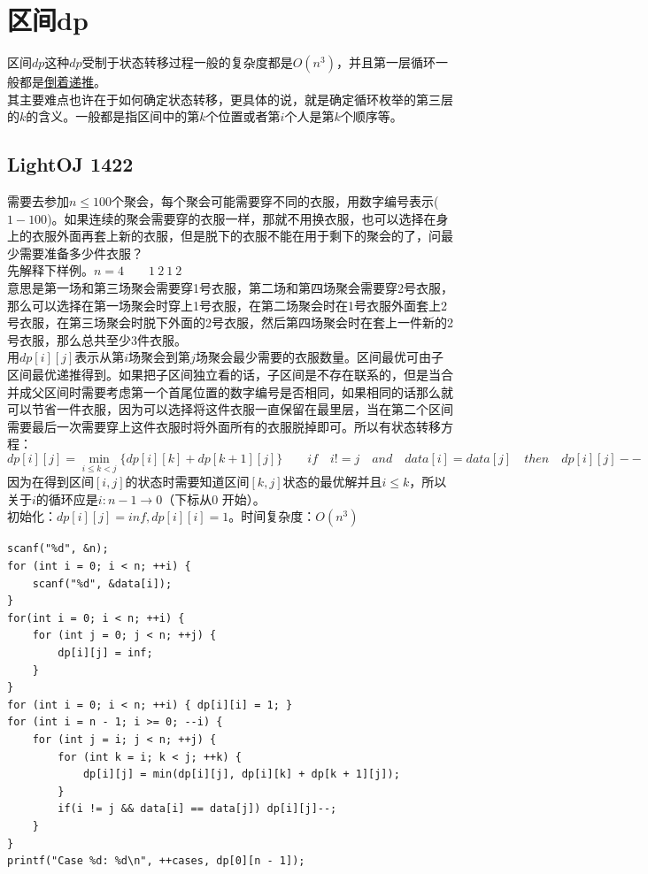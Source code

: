 \clearpage
\section{区间dp}

区间$dp$这种$dp$受制于状态转移过程一般的复杂度都是$O(n^3)$，并且第一层循环一般都是\underline{倒着递推}。 \\
其主要难点也许在于如何确定状态转移，更具体的说，就是确定循环枚举的第三层的$k$的含义。一般都是指区间中的第$k$个位置或者第$i$个人是第$k$个顺序等。

\subsection{LightOJ 1422}

需要去参加$n\leq 100$个聚会，每个聚会可能需要穿不同的衣服，用数字编号表示($1-100$)。如果连续的聚会需要穿的衣服一样，那就不用换衣服，也可以选择在身上的衣服外面再套上新的衣服，但是脱下的衣服不能在用于剩下的聚会的了，问最少需要准备多少件衣服？\\

\noindent 先解释下样例。$n=4 \qquad 1\  2\  1\  2$ \\
意思是第一场和第三场聚会需要穿1号衣服，第二场和第四场聚会需要穿2号衣服，那么可以选择在第一场聚会时穿上1号衣服，在第二场聚会时在1号衣服外面套上2号衣服，在第三场聚会时脱下外面的2号衣服，然后第四场聚会时在套上一件新的2号衣服，那么总共至少3件衣服。 \\
用$dp[i][j]$表示从第$i$场聚会到第$j$场聚会最少需要的衣服数量。区间最优可由子区间最优递推得到。如果把子区间独立看的话，子区间是不存在联系的，但是当合并成父区间时需要考虑第一个首尾位置的数字编号是否相同，如果相同的话那么就可以节省一件衣服，因为可以选择将这件衣服一直保留在最里层，当在第二个区间需要最后一次需要穿上这件衣服时将外面所有的衣服脱掉即可。所以有状态转移方程：
$$
dp[i][j]=\min_{i\leq k < j}\{dp[i][k]+dp[k+1][j]\}\qquad
if\quad i!=j\quad and\quad data[i]=data[j]\quad then\quad dp[i][j]--
$$
因为在得到区间$[i,j]$的状态时需要知道区间$[k,j]$状态的最优解并且$i\leq k$，所以关于$i$的循环应是$i:n-1\rightarrow 0$（下标从0 开始）。 \\
初始化：$dp[i][j]=inf,dp[i][i]=1$。时间复杂度：$O(n^3)$ \\

\begin{lstlisting}
scanf("%d", &n);
for (int i = 0; i < n; ++i) {
	scanf("%d", &data[i]);
}
for(int i = 0; i < n; ++i) {
	for (int j = 0; j < n; ++j) {
		dp[i][j] = inf;
	}
}
for (int i = 0; i < n; ++i) { dp[i][i] = 1; }
for (int i = n - 1; i >= 0; --i) {
	for (int j = i; j < n; ++j) {
		for (int k = i; k < j; ++k) {
			dp[i][j] = min(dp[i][j], dp[i][k] + dp[k + 1][j]);
		}
		if(i != j && data[i] == data[j]) dp[i][j]--;
	}
}
printf("Case %d: %d\n", ++cases, dp[0][n - 1]);
\end{lstlisting}

